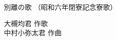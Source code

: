 \documentclass[10pt,b5j]{tarticle} %
\begin{document}
\begin{minipage}[c]{0.7\hsize} %
    \begin{center}
        {\LARGE
            別離の歌 %
        }
        {\small 
            （昭和六年閉寮記念寮歌） %
        }
    \end{center}
\end{minipage}
\begin{minipage}[c]{0.3\hsize} %
    \begin{flushright} %
        大槻均君 作歌\\中村小弥太君 作曲 %
    \end{flushright}
\end{minipage}
\end{document}

